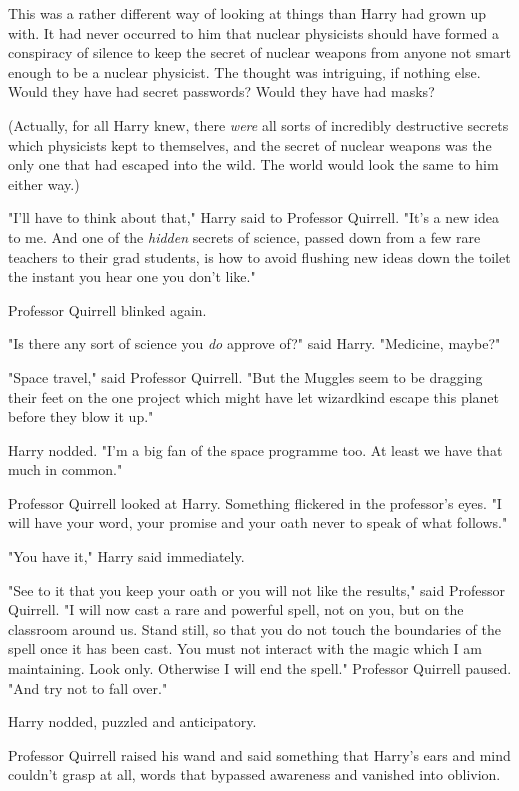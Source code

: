 This was a rather different way of looking at things than Harry had grown up
with. It had never occurred to him that nuclear physicists should have formed a
conspiracy of silence to keep the secret of nuclear weapons from anyone not
smart enough to be a nuclear physicist. The thought was intriguing, if nothing
else. Would they have had secret passwords? Would they have had masks?

(Actually, for all Harry knew, there \emph{were} all sorts of incredibly
destructive secrets which physicists kept to themselves, and the secret of
nuclear weapons was the only one that had escaped into the wild. The world
would look the same to him either way.)

"I'll have to think about that," Harry said to Professor Quirrell. "It's a new
idea to me. And one of the \emph{hidden} secrets of science, passed down from a
few rare teachers to their grad students, is how to avoid flushing new ideas
down the toilet the instant you hear one you don't like."

Professor Quirrell blinked again.

"Is there any sort of science you \emph{do} approve of?" said Harry. "Medicine,
maybe?"

"Space travel," said Professor Quirrell. "But the Muggles seem to be dragging
their feet on the one project which might have let wizardkind escape this
planet before they blow it up."

Harry nodded. "I'm a big fan of the space programme too. At least we have that
much in common."

Professor Quirrell looked at Harry. Something flickered in the professor's
eyes. "I will have your word, your promise and your oath never to speak of what
follows."

"You have it," Harry said immediately.

"See to it that you keep your oath or you will not like the results," said
Professor Quirrell. "I will now cast a rare and powerful spell, not on you, but
on the classroom around us. Stand still, so that you do not touch the
boundaries of the spell once it has been cast. You must not interact with the
magic which I am maintaining. Look only. Otherwise I will end the spell."
Professor Quirrell paused. "And try not to fall over."

Harry nodded, puzzled and anticipatory.

Professor Quirrell raised his wand and said something that Harry's ears and
mind couldn't grasp at all, words that bypassed awareness and vanished into
oblivion.

